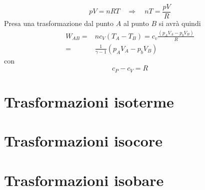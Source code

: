 \documentclass[x11names]{report}
\begin{document}
	\[ 
	pV = nRT \quad \Rightarrow \quad nT = \frac{pV}{R}
	\]
	Presa una trasformazione dal punto \(A\) al punto \(B\) si avrà quindi
	\begin{align*}
		W_{AB} =& nc_{V}(T_{A} - T_{B}) = c_{v}\frac{(p_{A}V_{A} - p_{b}V_{B})}{R} \\
			   =& \frac{1}{\gamma -1}(p_{A}V_{A} - p_{b}V_{B})
	\end{align*}
	con 
	\[ 
	\boxed{c_{P} - c_{V} = R}
	\]
	
	
	\section{Trasformazioni isoterme}
	\section{Trasformazioni isocore}
	\section{Trasformazioni isobare}
	
	
\end{document}
